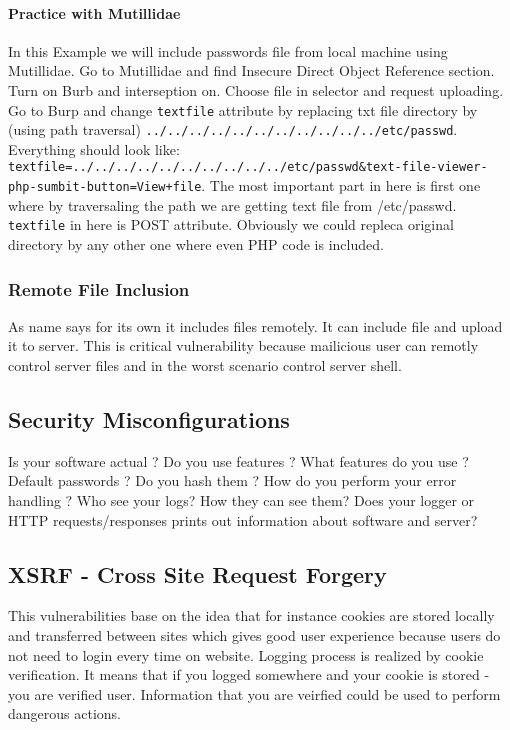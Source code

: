 \documentclass{article}[12pt]
\begin{document}
\paragraph{Practice with Mutillidae}
In this Example we will include passwords file from local machine using Mutillidae.
Go to Mutillidae and find Insecure Direct Object Reference section.
Turn on Burb and interseption on.
Choose file in selector and request uploading.
Go to Burp and change \texttt{textfile} attribute by replacing txt file directory by (using path traversal) \texttt{../../../../../../../../../../../etc/passwd}.
Everything should look like: \texttt{textfile=../../../../../../../../../../etc/passwd\&text-file-viewer-php-sumbit-button=View+file}.
The most important part in here is first one where by traversaling the path we are getting text file from /etc/passwd. \texttt{textfile} in here is POST attribute.
Obviously we could repleca original directory by any other one where even PHP code is included.

\subsubsection{Remote File Inclusion} As name says for its own it includes files remotely.
It can include file and upload it to server.
This is critical vulnerability because mailicious user can remotly control server files and in the worst scenario control server shell.



\subsection{Security Misconfigurations}
Is your software actual ? \newline
Do you use features ? What features do you use ? \newline
Default passwords ? Do you hash them ? \newline
How do you perform your error handling ? \newline
Who see your logs? How they can see them? \newline
Does your logger or HTTP requests/responses prints out information about software and server?


\subsection{XSRF - Cross Site Request Forgery}
This vulnerabilities base on the idea that for instance cookies are stored locally and transferred between sites which gives good user experience because users do not need to login every time on website.
Logging process is realized by cookie verification.
It means that if you logged somewhere and your cookie is stored - you are verified user.
Information that you are veirfied could be used to perform dangerous actions.
\end{document}
